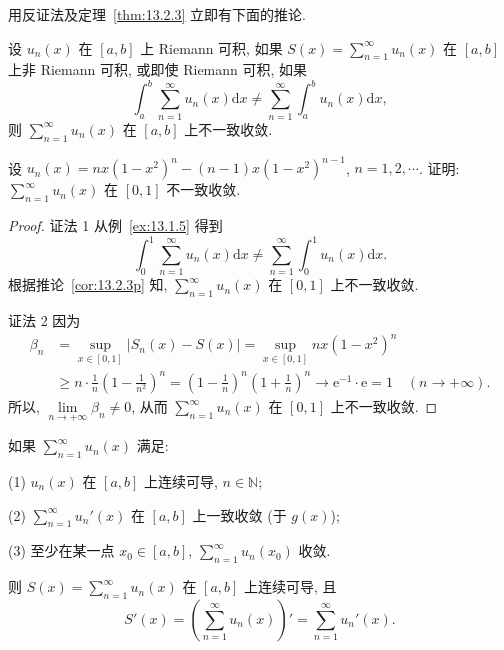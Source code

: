 用反证法及定理~\ref{thm:13.2.3} 立即有下面的推论.

\setcounter{corollary}{3}
\begin{corollaryp}\label{cor:13.2.3p}
设 $u_{n}(x)$ 在 $[a,b]$ 上 Riemann 可积, 如果 $S(x)=\sum_{n=1}^{\infty}u_{n}(x)$ 在 $[a,b]$ 上非 Riemann 可积, 或即使 Riemann 可积, 如果
\[
  \int_{a}^{b}\sum_{n=1}^{\infty}u_{n}(x)\mathrm{d}x\neq\sum_{n=1}^{\infty}\int_{a}^{b}u_{n}(x)\mathrm{d}x,
\]
则 $\sum_{n=1}^{\infty}u_{n}(x)$ 在 $[a,b]$ 上不一致收敛.
\end{corollaryp}

\begin{example}\label{ex:13.2.5}
设 $u_{n}(x)=nx(1-x^{2})^{n}-(n-1)x(1-x^{2})^{n-1}$, $n=1,2,\cdots$. 证明: $\sum_{n=1}^{\infty}u_{n}(x)$ 在 $[0,1]$ 不一致收敛.
\end{example}

\begin{proof}
证法 1 从例~\ref{ex:13.1.5} 得到
\[
  \int_{0}^{1}\sum_{n=1}^{\infty}u_{n}(x)\mathrm{d}x\neq\sum_{n=1}^{\infty}\int_{0}^{1}u_{n}(x)\mathrm{d}x.
\]
根据推论~\ref{cor:13.2.3p} 知, $\sum_{n=1}^{\infty}u_{n}(x)$ 在 $[0,1]$ 上不一致收敛.

证法 2 因为
\[
  \begin{aligned}
    \beta_{n}&=\sup_{x\in[0,1]}|S_{n}(x)-S(x)|=\sup_{x\in[0,1]}nx(1-x^{2})^{n}\\
    &\geqslant n\cdot\frac{1}{n}\left(1-\frac{1}{n^{2}}\right)^{n}=\left(1-\frac{1}{n}\right)^{n}\left(1+\frac{1}{n}\right)^{n}\to\mathrm{e}^{-1}\cdot\mathrm{e}=1\quad(n\to+\infty).
  \end{aligned}
\]
所以, $\lim\limits_{n\to+\infty}\beta_{n}\neq0$, 从而 $\sum_{n=1}^{\infty}u_{n}(x)$ 在 $[0,1]$ 上不一致收敛.
\end{proof}

\setcounter{theorem}{4}
\begin{theoremp}\label{thm:13.2.4p}
如果 $\sum_{n=1}^{\infty}u_{n}(x)$ 满足:

(1) $u_{n}(x)$ 在 $[a,b]$ 上连续可导, $n\in\mathbb{N}$;

(2) $\sum_{n=1}^{\infty}u_{n}'(x)$ 在 $[a,b]$ 上一致收敛 (于 $g(x)$);

(3) 至少在某一点 $x_{0}\in[a,b]$, $\sum_{n=1}^{\infty}u_{n}(x_{0})$ 收敛.

则 $S(x)=\sum_{n=1}^{\infty}u_{n}(x)$ 在 $[a,b]$ 上连续可导, 且
\[
  S'(x)=\left(\sum_{n=1}^{\infty}u_{n}(x)\right)'=\sum_{n=1}^{\infty}u_{n}'(x).
\]
\end{theoremp}


